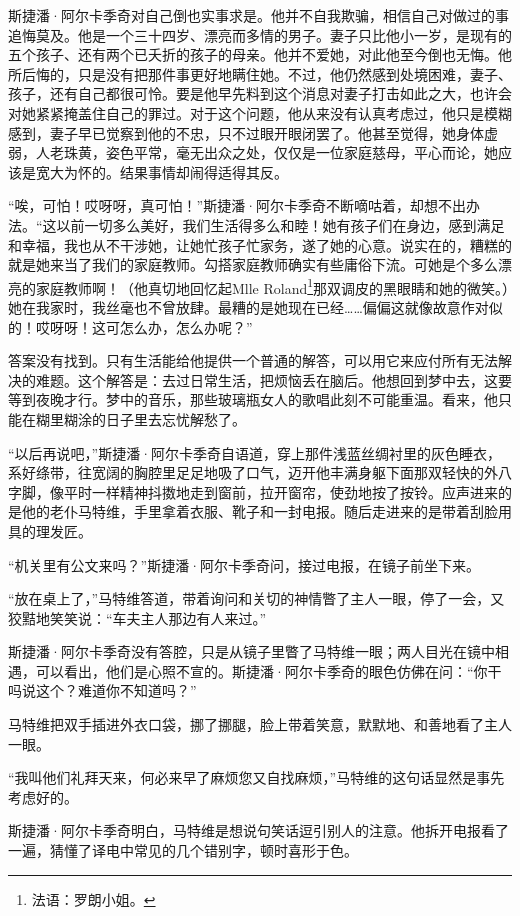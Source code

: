 \par 斯捷潘·阿尔卡季奇对自己倒也实事求是。他并不自我欺骗，相信自己对做过的事追悔莫及。他是一个三十四岁、漂亮而多情的男子。妻子只比他小一岁，是现有的五个孩子、还有两个已夭折的孩子的母亲。他并不爱她，对此他至今倒也无悔。他所后悔的，只是没有把那件事更好地瞒住她。不过，他仍然感到处境困难，妻子、孩子，还有自己都很可怜。要是他早先料到这个消息对妻子打击如此之大，也许会对她紧紧掩盖住自己的罪过。对于这个问题，他从来没有认真考虑过，他只是模糊感到，妻子早已觉察到他的不忠，只不过眼开眼闭罢了。他甚至觉得，她身体虚弱，人老珠黄，姿色平常，毫无出众之处，仅仅是一位家庭慈母，平心而论，她应该是宽大为怀的。结果事情却闹得适得其反。
\par “唉，可怕！哎呀呀，真可怕！”斯捷潘·阿尔卡季奇不断嘀咕着，却想不出办法。“这以前一切多么美好，我们生活得多么和睦！她有孩子们在身边，感到满足和幸福，我也从不干涉她，让她忙孩子忙家务，遂了她的心意。说实在的，糟糕的就是她来当了我们的家庭教师。勾搭家庭教师确实有些庸俗下流。可她是个多么漂亮的家庭教师啊！（他真切地回忆起Mlle Roland\footnote{法语：罗朗小姐。}那双调皮的黑眼睛和她的微笑。）她在我家时，我丝毫也不曾放肆。最糟的是她现在已经……偏偏这就像故意作对似的！哎呀呀！这可怎么办，怎么办呢？”
\par 答案没有找到。只有生活能给他提供一个普通的解答，可以用它来应付所有无法解决的难题。这个解答是：去过日常生活，把烦恼丢在脑后。他想回到梦中去，这要等到夜晚才行。梦中的音乐，那些玻璃瓶女人的歌唱此刻不可能重温。看来，他只能在糊里糊涂的日子里去忘忧解愁了。
\par “以后再说吧，”斯捷潘·阿尔卡季奇自语道，穿上那件浅蓝丝绸衬里的灰色睡衣，系好绦带，往宽阔的胸腔里足足地吸了口气，迈开他丰满身躯下面那双轻快的外八字脚，像平时一样精神抖擞地走到窗前，拉开窗帘，使劲地按了按铃。应声进来的是他的老仆马特维，手里拿着衣服、靴子和一封电报。随后走进来的是带着刮脸用具的理发匠。
\par “机关里有公文来吗？”斯捷潘·阿尔卡季奇问，接过电报，在镜子前坐下来。
\par “放在桌上了，”马特维答道，带着询问和关切的神情瞥了主人一眼，停了一会，又狡黠地笑笑说：“车夫主人那边有人来过。”
\par 斯捷潘·阿尔卡季奇没有答腔，只是从镜子里瞥了马特维一眼；两人目光在镜中相遇，可以看出，他们是心照不宣的。斯捷潘·阿尔卡季奇的眼色仿佛在问：“你干吗说这个？难道你不知道吗？”
\par 马特维把双手插进外衣口袋，挪了挪腿，脸上带着笑意，默默地、和善地看了主人一眼。
\par “我叫他们礼拜天来，何必来早了麻烦您又自找麻烦，”马特维的这句话显然是事先考虑好的。
\par 斯捷潘·阿尔卡季奇明白，马特维是想说句笑话逗引别人的注意。他拆开电报看了一遍，猜懂了译电中常见的几个错别字，顿时喜形于色。
